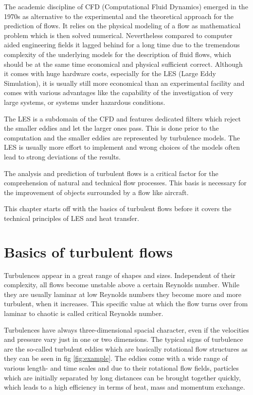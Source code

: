 The academic discipline of CFD (Computational Fluid Dynamics) emerged in the 1970s as alternative to the experimental and the theoretical approach for the prediction of flows. It relies on the physical modeling of a flow as mathematical problem which is then solved numerical. Nevertheless compared to computer aided engineering fields it lagged behind for a long time due to the tremendous complexity of the underlying models for the description of fluid flows, which should be at the same time economical and physical sufficient correct. Although it comes with huge hardware costs, especially for the LES (Large Eddy Simulation), it is usually still more economical than an experimental facility and comes with various advantages like the capability of the investigation of very large systems, or systems under hazardous conditions.

The LES is a subdomain of the CFD and features dedicated filters which reject the smaller eddies and let the larger ones pass. This is done prior to the computation and the smaller eddies are represented by turbulence models. The LES is usually more effort to implement and wrong choices of the models often lead to strong deviations of the results.

The analysis and prediction of turbulent flows is a critical factor for the comprehension of natural and technical flow processes. This basis is necessary for the improvement of objects surrounded by a flow like aircraft.

This chapter starts off with the basics of turbulent flows before it covers the technical principles of LES and heat transfer.

\section{Basics of turbulent flows}
Turbulences appear in a great range of shapes and sizes. Independent of their complexity, all flows become unstable above a certain Reynolds number. While they are usually laminar at low Reynolds numbers they become more and more turbulent, when it increases. This specific value at which the flow turns over from laminar to chaotic is called critical Reynolds number.

Turbulences have always three-dimensional spacial character, even if the velocities and pressure vary just in one or two dimensions. The typical signs of turbulence are the so-called turbulent eddies which are basically rotational flow structures as they can be seen in fig \ref{fig:example}. The eddies come with a wide range of various length- and time scales and due to their rotational flow fields, particles which are initially separated by long distances can be brought together quickly, which leads to a high efficiency in terms of heat, mass and momentum exchange.

